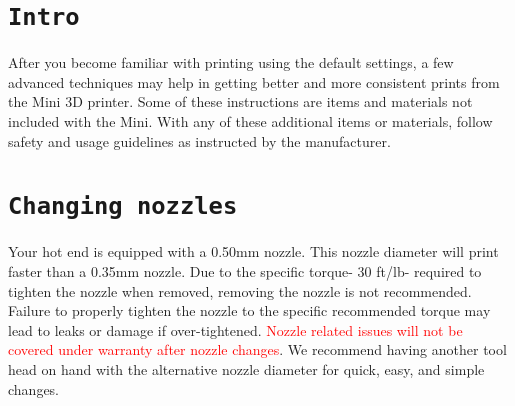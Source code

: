 %
%
%
%
%
%

\section{\texttt{Intro}}
After you become familiar with printing using the default settings, a few advanced techniques may help in getting better and more consistent prints from the Mini 3D printer. Some of these instructions are items and materials not included with the Mini. With any of these additional items or materials, follow safety and usage guidelines as instructed by the manufacturer.


\section{\texttt{Changing nozzles}}
Your hot end is equipped with a 0.50mm nozzle. This nozzle diameter will print faster than a 0.35mm nozzle. Due to the specific torque- 30 ft/lb- required to tighten the nozzle when removed, removing the nozzle is not recommended. Failure to properly tighten the nozzle to the specific recommended torque may lead to leaks or damage if over-tightened. \textcolor{red}{Nozzle related issues will not be covered under warranty after nozzle changes}. We recommend having another tool head on hand with the alternative nozzle diameter for quick, easy, and simple changes.


